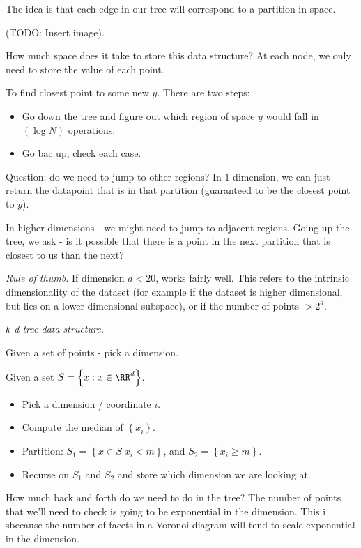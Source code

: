 The idea is that each edge in our tree will correspond to a partition in space.

(TODO: Insert image).

How much space does it take to store this data structure?  At each node, we only need to store the value of each point.

To find closest point to some new $y$.  There are two steps:

\begin{itemize}
  \item Go down the tree and figure out which region of space $y$ would fall in $(\log N)$ operations.
  \item Go bac up, check each case.
\end{itemize}

Question: do we need to jump to other regions?  In $1$ dimension, we can just return the datapoint that is in that partition (guaranteed to be the closest point to $y$).

In higher dimensions - we might need to jump to adjacent regions.  Going up the tree, we ask - is it possible that there is a point in the next partition that is closest to us than the next?

{\it Rule of thumb.} If dimension $d < 20$, works fairly well.  This refers to the intrinsic dimensionality of the dataset (for example if the dataset is higher dimensional, but lies on a lower dimensional subspace), or if the number of points $> 2^d$.

{\it $k$-d tree data structure.} 

Given a set of points - pick a dimension. 

Given a set $S = \left\{ x: x \in \RR^d \right\}$.
\begin{itemize}
  \item Pick a dimension / coordinate $i$.
  \item Compute the median of $\left\{ x_i  \right\}$.

  \item Partition: $S_1 = \left\{ x \in S | x_i < m \right\}$, and $S_2 = \left\{ x_i \geq m \right\}.$
  \item Recurse on $S_1$ and $S_2$ and store which dimension we are looking at.
\end{itemize}

How much back and forth do we need to do in the tree?  The number of points that we'll need to check is going to be exponential in the dimension.  This i sbecause the number of facets in a Voronoi diagram will tend to scale exponential in the dimension.

